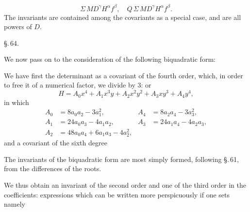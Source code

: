 \[
\Sigma \, M D^\gamma H^\alpha f^\beta, \quad Q \, \Sigma \, M D^\gamma H^\alpha f^\beta.
\]
The invariants are contained among the covariants as a
special case, and are all powers of $D$.

\begin{center}
\S.\,64.

\end{center}

We now pass on to the consideration of the following biquadratic form:

We have first the  determinant as a covariant of the fourth order, which, in order to free it of a numerical
factor, we divide by 3:
or
\[
H = A_0 x^4 + A_1 x^3 y + A_2 x^2 y^2 + A_3 x y^3 + A_4 y^4,
\]
in which
\[
\begin{aligned}
A_0 &= 8 a_0 a_2 - 3 a_1^2, & A_4 &= 8 a_2 a_4 - 3 a_3^2, \\
A_1 &= 24 a_0 a_3 - 4 a_1 a_2, & A_3 &= 24 a_1 a_4 - 4 a_2 a_3, \\
A_2 &= 48 a_0 a_4 + 6 a_1 a_3 - 4 a_2^2, & &
\end{aligned}
\]
and a covariant of the sixth degree

The invariants of the biquadratic form are most simply
formed, following \S.\,61, from the differences of the roots.

We thus obtain an invariant of the second order and one
of the third order in the coefficients:
expressions which can be written more perspicuously if one
sets
namely
